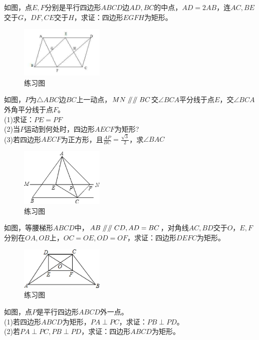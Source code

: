 \documentclass{ecnuthesis}
\newcommand\px{\mathrel{/\mkern-5mu/}}  %
\begin{document}
\begin{problem}
    如图，点$E,F$分别是平行四边形$ABCD$边$AD,BC$的中点，$AD=2AB$，连$AC,BE$交于$G$，$DF,CE$交于$H$，求证：四边形$EGFH$为矩形。
\end{problem}
\begin{figure}[H]
\centering
\includegraphics[width=4cm]{picture/605.jpeg}
\caption{练习图}
\end{figure}
\begin{problem}
    如图，$P$为$\triangle ABC$边$BC$上一动点，$MN\px\px BC$交$\angle BCA$平分线于点$E$，交$\angle BCA$外角平分线于点$F$。\\
    (1)求证：$PE=PF$ \\
    (2)当$P$运动到何处时，四边形$AECF$为矩形? \\
    (3)若四边形$AECF$为正方形，且$\frac{AP}{BC}=\frac{\sqrt{3}}{2}$，求$\angle BAC$ \\
\end{problem}
\begin{figure}[H]
\centering
\includegraphics[width=4cm]{picture/654.png}
\caption{练习图}
\end{figure}
\begin{problem}
    如图，等腰梯形$ABCD$中，$AB\px \px CD,AD=BC$，对角线$AC,BD$交于$O$，$E,F$分别在$OA,OB$上，$OC=OE,OD=OF$，求证：四边形$DEFC$为矩形。
\end{problem}
\begin{figure}[H]
\centering
\includegraphics[width=4cm]{picture/6_3_2.png}
\caption{练习图}
\end{figure}
\begin{problem}
    如图，点$P$是平行四边形$ABCD$外一点。\\
    (1)若四边形$ABCD$为矩形，$PA\perp PC$，求证：$PB\perp PD$。 \\
    (2)若$PA \perp PC,PB \perp PD$，求证：四边形$ABCD$为矩形。 \\
\end{problem}
\end{document}

